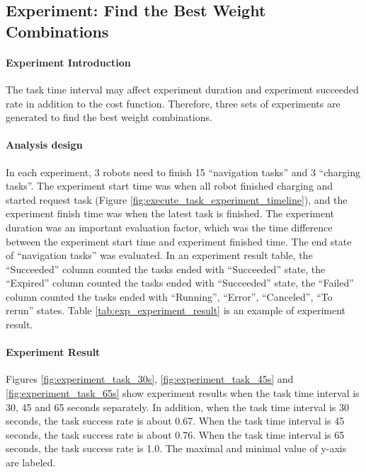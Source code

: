 \subsection{Experiment: Find the Best Weight Combinations}
\paragraph{Experiment Introduction}
The task time interval may affect experiment duration and experiment succeeded rate in addition to the cost function. Therefore, three sets of experiments are generated to find the best weight combinations. 

\paragraph{Analysis design}
In each experiment, 3 robots need to finish 15 ``navigation tasks'' and 3 ``charging tasks''.
The experiment start time was when all robot finished charging and started request task (Figure \ref{fig:execute_task_experiment_timeline}), and the experiment finish time was when the latest task is finished.
The experiment duration was an important evaluation factor, which was the time difference between the experiment start time and experiment finished time. 
The end state of ``navigation tasks'' was evaluated. In an experiment result table, the ``Succeeded'' column counted the tasks ended with ``Succeeded'' state, the ``Expired'' column counted the tasks ended with ``Succeeded'' state, the ``Failed'' column counted the tasks ended with ``Running'', ``Error'', ``Canceled'', ``To rerun'' states. 
Table \ref{tab:exp_experiment_result} is an example of experiment result. 

\paragraph{Experiment Result} 
Figures \ref{fig:experiment_task_30s}, \ref{fig:experiment_task_45s} and \ref{fig:experiment_task_65s} show experiment results when the task time interval is 30, 45 and 65 seconds separately. 
In addition, when the task time interval is 30 seconds, the task success rate is about 0.67. When the task time interval is 45 seconds, the task success rate is about 0.76. 
When the task time interval is 65 seconds, the task success rate is 1.0. The maximal and minimal value of y-axis are labeled.
